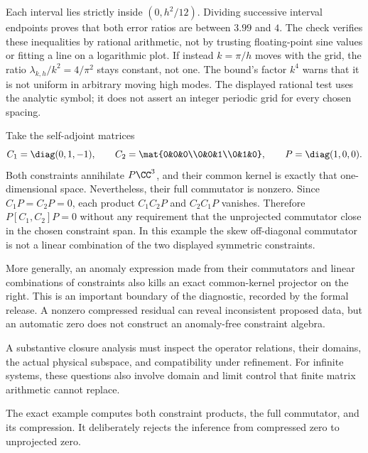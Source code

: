 Each interval lies strictly inside $(0,h^2/12)$. Dividing successive interval endpoints proves that both error ratios are between $3.99$ and $4$. The check verifies these inequalities by rational arithmetic, not by trusting floating-point sine values or fitting a line on a logarithmic plot.
If instead $k=\pi/h$ moves with the grid, the ratio $\lambda_{k,h}/k^2=4/\pi^2$ stays constant, not one. The bound's factor $k^4$ warns that it is not uniform in arbitrary moving high modes. The displayed rational test uses the analytic symbol; it does not assert an integer periodic grid for every chosen spacing.

Take the self-adjoint matrices
\[
C_1=\diag(0,1,-1),\qquad
C_2=\mat{0&0&0\\0&0&1\\0&1&0},\qquad
P=\diag(1,0,0).
\]
Both constraints annihilate $P\CC^3$, and their common kernel is exactly that one-dimensional space. Nevertheless, their full commutator is nonzero.
Since $C_1P=C_2P=0$, each product $C_1C_2P$ and $C_2C_1P$ vanishes. Therefore $P[C_1,C_2]P=0$ without any requirement that the unprojected commutator close in the chosen constraint span. In this example the skew off-diagonal commutator is not a linear combination of the two displayed symmetric constraints.

More generally, an anomaly expression made from their commutators and linear combinations of constraints also kills an exact common-kernel projector on the right. This is an important boundary of the diagnostic, recorded by the formal release. A nonzero compressed residual can reveal inconsistent proposed data, but an automatic zero does not construct an anomaly-free constraint algebra.

A substantive closure analysis must inspect the operator relations, their domains, the actual physical subspace, and compatibility under refinement. For infinite systems, these questions also involve domain and limit control that finite matrix arithmetic cannot replace.

The exact example computes both constraint products, the full commutator, and its compression. It deliberately rejects the inference from compressed zero to unprojected zero.

